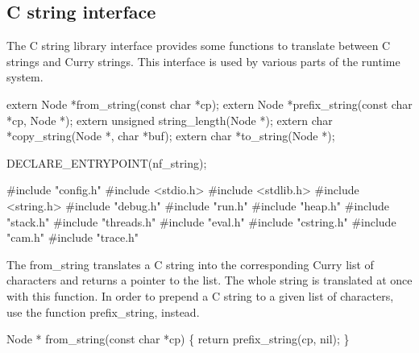 %
%
\subsection{C string interface}\label{sec:string}
The C string library interface provides some functions to translate
between C strings and Curry strings. This interface is used by various
parts of the runtime system.

\nwenddocs{}\endmoddef\nwstartdeflinemarkup\nwenddeflinemarkup
extern Node     *from_string(const char *cp);
extern Node     *prefix_string(const char *cp, Node *);
extern unsigned string_length(Node *);
extern char     *copy_string(Node *, char *buf);
extern char     *to_string(Node *);

DECLARE_ENTRYPOINT(nf_string);

\nwendcode{}\nwdocspar
\nwenddocs{}\endmoddef\nwstartdeflinemarkup{}\nwenddeflinemarkup
#include "config.h"
#include <stdio.h>
#include <stdlib.h>
#include <string.h>
#include "debug.h"
#include "run.h"
#include "heap.h"
#include "stack.h"
#include "threads.h"
#include "eval.h"
#include "cstring.h"
#include "cam.h"
#include "trace.h"

\nwendcode{}\nwdocspar
The {\Tt{}from{\_}string\nwendquote} translates a C string into the corresponding Curry
list of characters and returns a pointer to the list. The whole string
is translated at once with this function. In order to prepend a C
string to a given list of characters, use the function {\Tt{}prefix{\_}string\nwendquote},
instead.

\nwenddocs{}\plusendmoddef\nwstartdeflinemarkup{}\nwenddeflinemarkup
Node *
from_string(const char *cp)
\{
    return prefix_string(cp, nil);
\}


